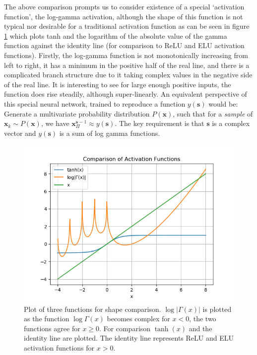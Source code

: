 \documentclass{article}
\begin{document}
The above comparison prompts us to consider existence of a special `activation function', the log-gamma activation, although the shape of this function is not typical nor desirable for a traditional activation function as can be seen in figure \ref{fig:activation} which plots tanh and the logarithm of the absolute value of the gamma function against the identity line (for comparison to ReLU and ELU activation functions). Firstly, the log-gamma function is not monotonically increasing from left to right, it has a minimum in the positive half of the real line, and there is a complicated branch structure due to it taking complex values in the negative side of the real line. It is interesting to see for large enough positive inputs, the function does rise steadily, although super-linearly. An equivalent perspective of this special neural network, trained to reproduce a function $y(\mathbf{s})$ would be: Generate a multivariate probability distribution $P(\mathbf{x})$, such that for a \emph{sample} of $\mathbf{x}_k \sim P(\mathbf{x})$, we have $\mathbf{x}_\Pi^{\mathbf{s}-1} \approx y(\mathbf{s})$. The key requirement is that $\mathbf{s}$ is a complex vector and $y(\mathbf{s})$ is a sum of log gamma functions. \\

\begin{figure}
\includegraphics[scale=1]{ActivationFunctions}
\caption{Plot of three functions for shape comparison. $\log |\Gamma(x)|$ is plotted as the function $\log \Gamma(x)$ becomes complex for $x<0$, the two functions agree for $x \ge 0$. For comparison $\tanh(x)$ and the identity line are plotted. The identity line represents ReLU and ELU activation functions for $x>0$. }
\label{fig:activation}
\end{figure}
\end{document}
